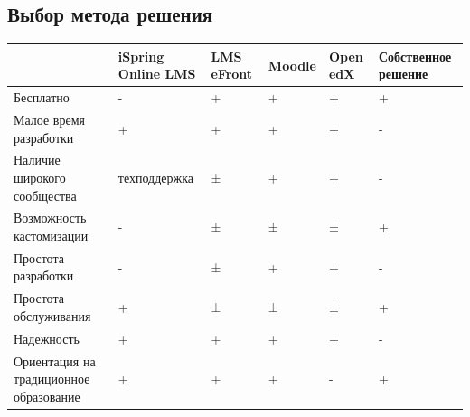 \documentclass[a4paper,14pt]{article}
\begin{document}



\subsection{Выбор метода решения}

\begin{landscape}
	\begin{table}[!h]
		\begin{center}
			\begin{flushleft}
			\end{flushleft}
			
			\begin{tabular}{|l|l|l|l|l|l|}
				\hline
				& iSpring Online LMS & LMS eFront & Moodle & Open edX & Собственное решение \\ \hline
				Бесплатно                              & -                  & +          & +      & +        & +                   \\ \hline
				Малое время разработки                 & +                  & +          & +      & +        & -                   \\ \hline
				Наличие широкого сообщества            & техподдержка       & ±          & +      & +        & -                   \\ \hline
				Возможность кастомизации               & -                  & ±          & ±      & ±        & +                   \\ \hline
				Простота разработки                    & -                  & ±          & +      & +        & -                   \\ \hline
				Простота обслуживания                  & +                  & ±          & ±      & ±        & +                   \\ \hline
				Надежность                             & +                  & +          & +      & +        & -                   \\ \hline
				Ориентация на традиционное образование & +                  & +          & +      & -        & +                   \\ \hline
			\end{tabular}
		\end{center}
	\end{table}
\end{landscape}
\end{document}
